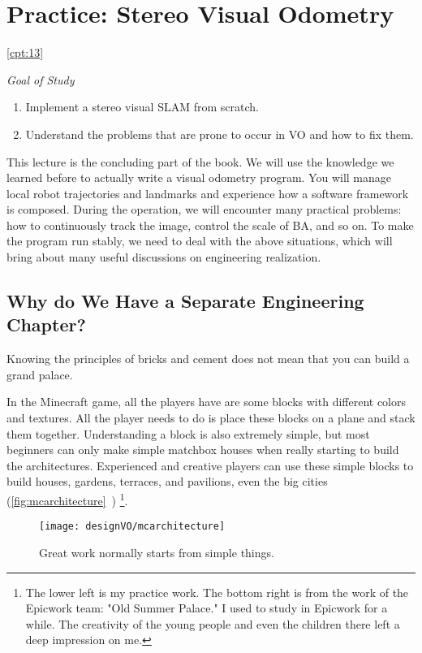 \chapter{Practice: Stereo Visual Odometry}
\ref{cpt:13}
\begin{mdframed}  
	\textit{Goal of Study}
	\begin{enumerate}[labelindent=0em,leftmargin=1.5em]
	\item Implement a stereo visual SLAM from scratch.
	\item Understand the problems that are prone to occur in VO and how to fix them.
	\end{enumerate}
\end{mdframed}

This lecture is the concluding part of the book. We will use the knowledge we learned before to actually write a visual odometry program. You will manage local robot trajectories and landmarks and experience how a software framework is composed. During the operation, we will encounter many practical problems: how to continuously track the image, control the scale of BA, and so on. To make the program run stably, we need to deal with the above situations, which will bring about many useful discussions on engineering realization.

\newpage
\section{Why do We Have a Separate Engineering Chapter?}
Knowing the principles of bricks and cement does not mean that you can build a grand palace.

In the Minecraft game, all the players have are some blocks with different colors and textures. All the player needs to do is place these blocks on a plane and stack them together. Understanding a block is also extremely simple, but most beginners can only make simple matchbox houses when really starting to build the architectures. Experienced and creative players can use these simple blocks to build houses, gardens, terraces, and pavilions, even the big cities (\autoref{fig:mcarchitecture}~) \footnote{The lower left is my practice work. The bottom right is from the work of the Epicwork team: "Old Summer Palace." I used to study in Epicwork for a while. The creativity of the young people and even the children there left a deep impression on me. }.

\begin{figure}[!htp]
	\centering    
	\texttt{[image: designVO/mcarchitecture]}\\
	\caption{Great work normally starts from simple things.}
	\label{fig:mcarchitecture}
\end{figure}

